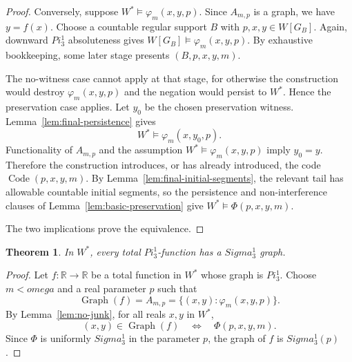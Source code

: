 \documentclass{article}
\newtheorem{theorem}{Theorem}[section]
\theoremstyle{remark}
\theoremstyle{plain}
\newcommand{\Code}{\operatorname{Code}}
\newcommand{\Graph}{\operatorname{Graph}}
\newcommand{\Real}{\mathbb{R}}
\def\Pi{Pi}%
\def\Sigma{Sigma}%
\def\omega{omega}%
\begin{document}
\begin{proof}
Conversely, suppose $W^*\models\varphi_m(x,y,p)$. Since $A_{m,p}$ is a graph,
we have $y=f(x)$. Choose a countable regular support $B$ with
$p,x,y\in W[G_B]$. Again, downward $\Pi^1_3$ absoluteness gives
$W[G_B]\models\varphi_m(x,y,p)$. By exhaustive bookkeeping, some later stage
presents $(B,p,x,y,m)$.

The no-witness case cannot apply at that stage, for otherwise the construction
would destroy $\varphi_m(x,y,p)$ and the negation would persist to $W^*$. Hence
the preservation case applies. Let $y_0$ be the chosen preservation witness.
Lemma~\ref{lem:final-persistence} gives
\[
   W^*\models\varphi_m(x,y_0,p).
\]
Functionality of $A_{m,p}$ and the assumption
$W^*\models\varphi_m(x,y,p)$ imply $y_0=y$. Therefore the construction
introduces, or has already introduced, the code $\Code(p,x,y,m)$. By
Lemma~\ref{lem:final-initial-segments}, the relevant tail has allowable
countable initial segments, so the persistence and non-interference clauses of
Lemma~\ref{lem:basic-preservation} give $W^*\models\Phi(p,x,y,m)$.

The two implications prove the equivalence.
\end{proof}

\begin{theorem}\label{thm:model-total-graphs}
In $W^*$, every total $\Pi^1_3$-function has a $\Sigma^1_3$ graph.
\end{theorem}

\begin{proof}
Let $f:\Real\to\Real$ be a total function in $W^*$ whose graph is $\Pi^1_3$.
Choose $m<\omega$ and a real parameter $p$ such that
\[
   \Graph(f)=A_{m,p}=\{(x,y):\varphi_m(x,y,p)\}.
\]
By Lemma~\ref{lem:no-junk}, for all reals $x,y$ in $W^*$,
\[
   (x,y)\in\Graph(f)
   \quad\Longleftrightarrow\quad
   \Phi(p,x,y,m).
\]
Since $\Phi$ is uniformly $\Sigma^1_3$ in the parameter $p$, the graph of $f$ is
$\Sigma^1_3(p)$.
\end{proof}
\end{document}
